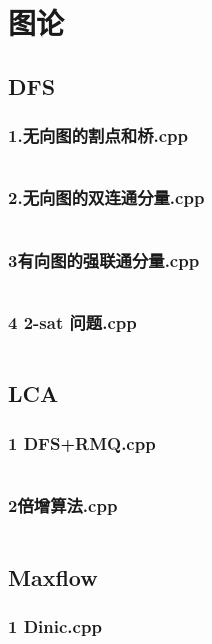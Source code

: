 \documentclass[a4paper,11pt]{article}
\begin{document}
\section{图论}
\subsection{DFS}
\subsubsection{1.无向图的割点和桥.cpp}
\inputminted[breaklines]{c++}{"D:/tmplz/templates/图论/DFS/1.无向图的割点和桥.cpp"}
\subsubsection{2.无向图的双连通分量.cpp}
\inputminted[breaklines]{c++}{"D:/tmplz/templates/图论/DFS/2.无向图的双连通分量.cpp"}
\subsubsection{3有向图的强联通分量.cpp}
\inputminted[breaklines]{c++}{"D:/tmplz/templates/图论/DFS/3有向图的强联通分量.cpp"}
\subsubsection{4 2-sat 问题.cpp}
\inputminted[breaklines]{c++}{"D:/tmplz/templates/图论/DFS/4 2-sat 问题.cpp"}
\subsection{LCA}
\subsubsection{1 DFS+RMQ.cpp}
\inputminted[breaklines]{c++}{"D:/tmplz/templates/图论/LCA/1 DFS+RMQ.cpp"}
\subsubsection{2倍增算法.cpp}
\inputminted[breaklines]{c++}{"D:/tmplz/templates/图论/LCA/2倍增算法.cpp"}
\subsection{Maxflow}
\subsubsection{1 Dinic.cpp}
\inputminted[breaklines]{c++}{"D:/tmplz/templates/图论/Maxflow/1 Dinic.cpp"}
\end{document}
